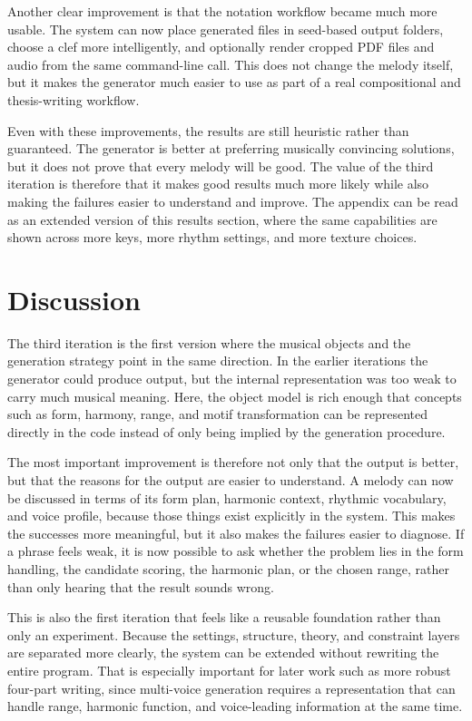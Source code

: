 Another clear improvement is that the notation workflow became much more usable. The system can now place generated files in seed-based output folders, choose a clef more intelligently, and optionally render cropped PDF files and audio from the same command-line call. This does not change the melody itself, but it makes the generator much easier to use as part of a real compositional and thesis-writing workflow.

Even with these improvements, the results are still heuristic rather than guaranteed. The generator is better at preferring musically convincing solutions, but it does not prove that every melody will be good. The value of the third iteration is therefore that it makes good results much more likely while also making the failures easier to understand and improve. The appendix can be read as an extended version of this results section, where the same capabilities are shown across more keys, more rhythm settings, and more texture choices.

\section{Discussion}
The third iteration is the first version where the musical objects and the generation strategy point in the same direction. In the earlier iterations the generator could produce output, but the internal representation was too weak to carry much musical meaning. Here, the object model is rich enough that concepts such as form, harmony, range, and motif transformation can be represented directly in the code instead of only being implied by the generation procedure.

The most important improvement is therefore not only that the output is better, but that the reasons for the output are easier to understand. A melody can now be discussed in terms of its form plan, harmonic context, rhythmic vocabulary, and voice profile, because those things exist explicitly in the system. This makes the successes more meaningful, but it also makes the failures easier to diagnose. If a phrase feels weak, it is now possible to ask whether the problem lies in the form handling, the candidate scoring, the harmonic plan, or the chosen range, rather than only hearing that the result sounds wrong.

This is also the first iteration that feels like a reusable foundation rather than only an experiment. Because the settings, structure, theory, and constraint layers are separated more clearly, the system can be extended without rewriting the entire program. That is especially important for later work such as more robust four-part writing, since multi-voice generation requires a representation that can handle range, harmonic function, and voice-leading information at the same time.

